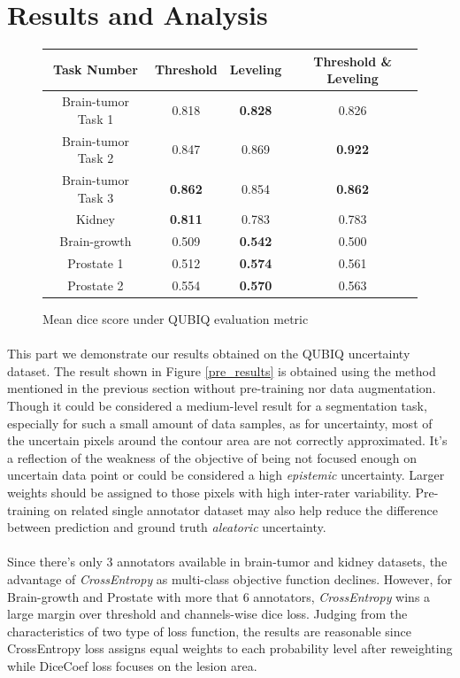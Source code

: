 \documentclass[12pt]{extarticle}
\begin{document}
\section{Results and Analysis}
\begin{figure}[ht!]
\begin{center}
    \begin{tabular}{|| c | c | c | c ||}
       \hline
       Task Number & Threshold & Leveling & Threshold \& Leveling \\
       \hline \hline
        Brain-tumor Task 1 & 0.818 & \textbf{0.828} & 0.826 \\
        Brain-tumor Task 2 & 0.847 & 0.869 & \textbf{0.922}\\
        Brain-tumor Task 3 & \textbf{0.862} & 0.854 & \textbf{0.862}\\
        Kidney & \textbf{0.811} & 0.783 & 0.783\\
        Brain-growth & 0.509 & \textbf{0.542} & 0.500  \\
        Prostate 1 & 0.512 & \textbf{0.574} & 0.561 \\
        Prostate 2 & 0.554 & \textbf{0.570} & 0.563\\
        \hline \hline
    \end{tabular}
\end{center}
\caption{Mean dice score under QUBIQ evaluation metric}
\end{figure}
\paragraph{}
This part we demonstrate our results obtained on the QUBIQ uncertainty dataset.
The result shown in Figure \ref{pre_results} is obtained using the method mentioned in the previous 
section without pre-training nor data augmentation.
Though it could be considered a medium-level result for a segmentation task, especially for such
a small amount of data samples, as for uncertainty, most of the uncertain pixels around the contour area are not 
correctly approximated. It's a reflection of the weakness of the objective of 
being not focused enough on uncertain data point or could be considered a high \textit{epistemic} uncertainty. 
Larger weights should be assigned to those pixels with high inter-rater variability. Pre-training on 
related single annotator dataset may also help reduce the difference between 
prediction and ground truth \textit{aleatoric} uncertainty.

\paragraph{}
Since there's only 3 annotators available in brain-tumor and kidney datasets, the advantage of \textit{CrossEntropy} as 
multi-class objective function declines. However, for Brain-growth and Prostate with more that 6 annotators, \textit{CrossEntropy}
wins a large margin over threshold and channels-wise dice loss. Judging from the characteristics of two type of 
loss function, the results are reasonable since CrossEntropy loss assigns equal weights to each probability level after reweighting while DiceCoef loss focuses on the lesion area. 
\end{document}
